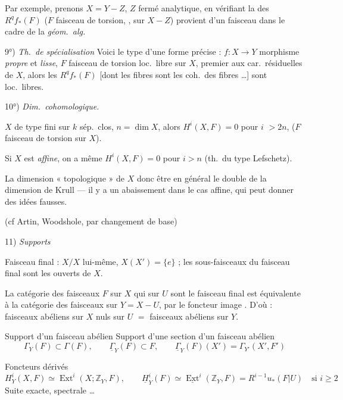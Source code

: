 \documentclass[11pt,a4paper]{article}
\begin{document}
Par exemple, prenons $X = Y - Z$, $Z$ fermé analytique, en vérifiant
 la  des $R^q f_{*}(F)$ ($F$ faisceau de
torsion, , sur $X - Z$) \struck{\ill{}} provient d'un
faisceau dans le cadre de la \emph{géom.\ alg.}

9°) \emph{Th.\ de spécialisation} Voici le type d'une forme précise :
$f : X \to Y$ morphisme \emph{propre} et \emph{lisse}, $F$ faisceau de
torsion loc.\ libre sur $X$, premier aux car.\ résiduelles de $X$, alors les
$R^q f_{*}(F)$ [dont les fibres sont les coh.\ des fibres …] sont loc.\ libres.

10°) \emph{Dim.\ cohomologique.}

$X$ de type fini sur $k$ sép.\ clos, $n = \dim X$, alors
$H^i(X, F) = 0$ pour $i$ \struck{$\geq$} $> 2n$,
($F$ faisceau de torsion sur $X$).

Si $X$ est \emph{affine}, on a même $H^i(X, F) = 0$ pour $i > n$ (th.\ du
type Lefschetz).

La dimension « topologique » de $X$  donc être en général le
double de la dimension de Krull — il y a un abaissement dans le cas affine, qui
peut donner des idées fausses.

(cf Artin, Woodshole, par changement de base)

11) \emph{Supports} 

Faisceau final : $X/X$ lui-même, $X(X') = \{e\}$ ; les sous-faisceaux du
faisceau final  sont les ouverts de $X$.

La catégorie des faisceaux $F$ sur $X$ qui sur $U$ sont le faisceau final est
équivalente à la catégorie des faisceaux sur $Y = X - U$, par le foncteur image
. D'où : faisceaux abéliens sur $X$ nuls sur $U$ $=$ faisceaux
abéliens sur $Y$.

Support d'un faisceau abélien
Support d'une section d'un faisceau abélien
\[
  \Gamma_Y(F) \subset \Gamma(F), \qquad
  \underline{\Gamma}_Y(F) \subset F, \qquad
  \underline{\Gamma}_Y(F)(X') = \Gamma_{Y'}(X', F')
\]

Foncteurs dérivés
\[
  H^i_Y(X, F) \simeq \operatorname{Ext}^i(X ; \mathbb{Z}_Y, F), \qquad
  \underline{H}^i_Y(F) \simeq \underline{\operatorname{Ext}}^i(\mathbb{Z}_Y, F)
  = R^{i-1} u_{*}(F|U) \quad \text{si } i \geq 2
\]
Suite exacte, spectrale …
\end{document}
